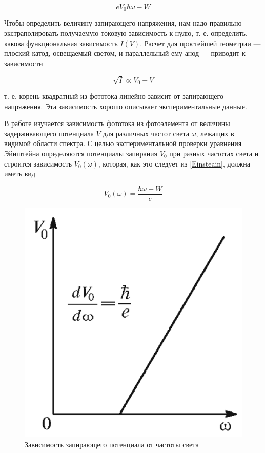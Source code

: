\documentclass[12pt]{kiarticle}
\begin{document}
	\begin{equation}\label{Einsteain}
	eV_0	\hbar\omega - W 
	\end{equation}
	
	Чтобы определить величину запирающего
	напряжения, нам надо правильно экстраполировать получаемую токовую зависимость к нулю, т. е. определить, какова функциональная
	зависимость $ I(V ) $. Расчет для простейшей геометрии --- плоский катод, освещаемый светом, и параллельный ему анод --- приводит к зависимости
	
	\begin{equation}\label{sqrt I = V}
	\sqrt{I} \propto V_0 - V
	\end{equation}
	
	т. е. корень квадратный из фототока линейно
	зависит от запирающего напряжения. Эта зависимость хорошо описывает экспериментальные данные.
	
	В работе изучается зависимость фототока из фотоэлемента от величины задерживающего потенциала $ V $ для различных частот света $ \omega $, лежащих в видимой области спектра. С целью экспериментальной
	проверки уравнения Эйнштейна определяются потенциалы запирания
	$ V_0 $ при разных частотах света и строится зависимость $ V_0(\omega) $, которая, как это следует из \eqref{Einsteain}, должна иметь вид
	
	\begin{equation}\label{V(w)}
	V_0 (\omega) = \dfrac{\hbar\omega - W}{e}
	\end{equation}
	
		\begin{figure}
		\includegraphics[width=\linewidth]{V(w)}
		\caption{Зависимость запирающего потенциала
			от частоты света}
		\label{ris V(w)}
	\end{figure}
	
\end{document}
